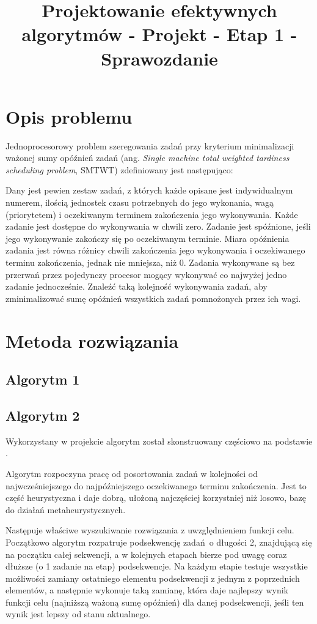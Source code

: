 \documentclass[polish,polish,a4paper]{article}
\title{Projektowanie efektywnych algorytmów - Projekt - Etap 1 - Sprawozdanie}
\begin{document}

\newpage

\section{Opis problemu}

Jednoprocesorowy problem szeregowania zadań przy kryterium minimalizacji ważonej sumy opóźnień zadań (ang. \textit{Single machine total weighted tardiness scheduling problem}, SMTWT) zdefiniowany jest następująco:

Dany jest pewien zestaw zadań, z których każde opisane jest indywidualnym numerem, ilością jednostek czasu potrzebnych do jego wykonania, wagą (priorytetem) i oczekiwanym terminem zakończenia jego wykonywania. Każde zadanie jest dostępne do wykonywania w chwili zero. Zadanie jest spóźnione, jeśli jego wykonywanie zakończy się po oczekiwanym terminie. Miara opóźnienia zadania jest równa różnicy chwili zakończenia jego wykonywania i oczekiwanego terminu zakończenia, jednak nie mniejsza, niż 0. Zadania wykonywane są bez przerwań przez pojedynczy procesor mogący wykonywać co najwyżej jedno zadanie jednocześnie. Znaleźć taką kolejność wykonywania zadań, aby zminimalizować sumę opóźnień wszystkich zadań pomnożonych przez ich wagi.

\section{Metoda rozwiązania}
\subsection{Algorytm 1}

\subsection{Algorytm 2}

Wykorzystany w projekcie algorytm został skonstruowany częściowo na podstawie \cite{Dynasearch}.

Algorytm rozpoczyna pracę od posortowania zadań w kolejności od najwcześniejszego do najpóźniejszego oczekiwanego terminu zakończenia. Jest to część heurystyczna i daje dobrą, ułożoną najczęściej korzystniej niż losowo, bazę do działań metaheurystycznych.

Następuje właściwe wyszukiwanie rozwiązania z uwzględnieniem funkcji celu. Początkowo algorytm rozpatruje podsekwencję zadań o długości 2, znajdującą się na początku całej sekwencji, a w kolejnych etapach bierze pod uwagę coraz dłuższe (o 1 zadanie na etap) podsekwencje. Na każdym etapie testuje wszystkie możliwości zamiany ostatniego elementu podsekwencji z jednym z poprzednich elementów, a następnie wykonuje taką zamianę, która daje najlepszy wynik funkcji celu (najniższą ważoną sumę opóźnień) dla danej podsekwencji, jeśli ten wynik jest lepszy od stanu aktualnego.
\end{document}
